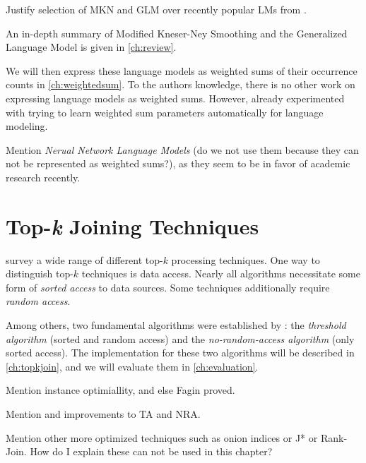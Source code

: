 \begin{draft}
Justify selection of MKN and GLM over recently popular LMs from
\textcite{Chelba2013}.
\end{draft}

An in-depth summary of Modified Kneser-Ney Smoothing and the Generalized
Language Model is given in \cref{ch:review}.

We will then express these language models as weighted sums of their occurrence
counts in \cref{ch:weightedsum}.
To the authors knowledge, there is no other work on expressing language models
as weighted sums.
However, \textcite{JelinekMercer1980} already experimented with trying to learn
weighted sum parameters automatically for language modeling.

\begin{draft}
Mention \emph{Nerual Network Language Models} \parencite{Bengio2003,Mikolov2012}
(do we not use them because they can not be represented as weighted sums?), as
they seem to be in favor of academic research recently.
\end{draft}

\section{Top-\emph{k} Joining Techniques}

\textcite{Ilyas2008} survey a wide range of different top-$k$ processing
techniques.
One way to distinguish top-$k$ techniques is data access.
Nearly all algorithms necessitate some form of \emph{sorted access} to data
sources.
Some techniques additionally require \emph{random access}.

Among others, two fundamental algorithms were established by
\textcite{Fagin2001}: the \emph{threshold algorithm} (sorted and random access)
and the \emph{no-random-access algorithm} (only sorted access).
The implementation for these two algorithms will be described in
\cref{ch:topkjoin}, and we will evaluate them in \cref{ch:evaluation}.

\begin{draft}
Mention instance optimiallity, and else Fagin proved.
\end{draft}


\begin{draft}
Mention \textcite{Guentzer2000} and \textcite{Guentzer2001} improvements to TA
and NRA.
\end{draft}

\begin{draft}
Mention other more optimized techniques such as onion indices or J* or
Rank-Join.
How do I explain these can not be used in this chapter?
\end{draft}
